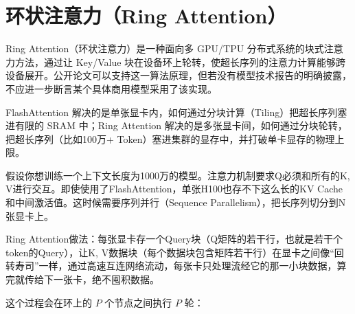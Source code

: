 \setcounter{section}{2}

\hypertarget{ux73afux72b6ux6ce8ux610fux529bring-attention}{%
\section{环状注意力（Ring Attention）}\label{ux73afux72b6ux6ce8ux610fux529bring-attention}}

Ring Attention（环状注意力）是一种面向多 GPU/TPU 分布式系统的块式注意力方法，通过让 Key/Value 块在设备环上轮转，使超长序列的注意力计算能够跨设备展开。公开论文可以支持这一算法原理，但若没有模型技术报告的明确披露，不应进一步断言某个具体商用模型采用了该实现。

FlashAttention 解决的是单张显卡内，如何通过分块计算（Tiling）把超长序列塞进有限的 SRAM 中；Ring Attention 解决的是多张显卡间，如何通过分块轮转，把超长序列（比如100万+ Token）塞进集群的显存中，并打破单卡显存的物理上限。

假设你想训练一个上下文长度为1000万的模型。注意力机制要求Q必须和所有的K, V进行交互。即使使用了FlashAttention，单张H100也存不下这么长的KV Cache和中间激活值。这时候需要序列并行（Sequence Parallelism），把长序列切分到N张显卡上。

Ring Attention做法：每张显卡存一个Query块（Q矩阵的若干行，也就是若干个token的Query），让K, V数据块（每个数据块包含矩阵若干行）在显卡之间像``回转寿司''一样，通过高速互连网络流动，每张卡只处理流经它的那一小块数据，算完就传给下一张卡，绝不囤积数据。

这个过程会在环上的 \(P\) 个节点之间执行 \(P\) 轮：

